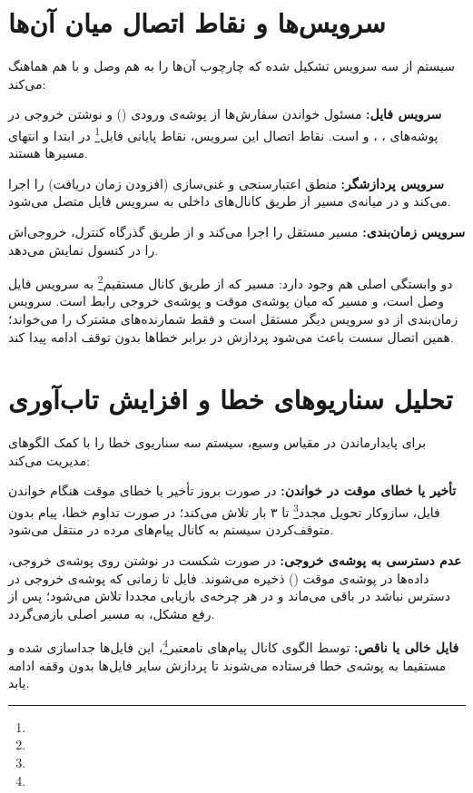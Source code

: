 \documentclass[a4paper,12pt]{article}
\newcommand{\term}[1]{\textbf{\textcolor{sbublue2}{#1:}}}
\begin{document}
\section{سرویس‌ها و نقاط اتصال میان آن‌ها}
سیستم از سه سرویس تشکیل شده که چارچوب  آن‌ها را به هم وصل و با هم هماهنگ می‌کند:
\begin{terms}
  \item \term{سرویس فایل} مسئول خواندن سفارش‌ها از پوشه‌ی ورودی () و نوشتن خروجی در پوشه‌های ، ،  و  است. نقاط اتصال این سرویس، نقاط پایانی فایل\footnote{} در ابتدا و انتهای مسیرها هستند.
  \item \term{سرویس پردازشگر} منطق اعتبارسنجی و غنی‌سازی (افزودن زمان دریافت) را اجرا می‌کند و در میانه‌ی مسیر  از طریق کانال‌های داخلی به سرویس فایل متصل می‌شود.
  \item \term{سرویس زمان‌بندی} مسیر مستقل  را اجرا می‌کند و از طریق گذرگاه کنترل، خروجی‌اش را در کنسول نمایش می‌دهد.
\end{terms}
دو وابستگی اصلی هم وجود دارد: مسیر  که از طریق کانال مستقیم\footnote{} به سرویس فایل وصل است، و مسیر  که میان پوشه‌ی موقت و پوشه‌ی خروجی رابط است. سرویس زمان‌بندی از دو سرویس دیگر مستقل است و فقط شمارنده‌های مشترک را می‌خواند؛ همین اتصال سست باعث می‌شود پردازش در برابر خطاها بدون توقف ادامه پیدا کند.

\section{تحلیل سناریوهای خطا و افزایش تاب‌آوری}
برای پایدارماندن در مقیاس وسیع، سیستم سه سناریوی خطا را با کمک الگوهای  مدیریت می‌کند:
\begin{terms}
  \item \term{تأخیر یا خطای موقت در خواندن} در صورت بروز تأخیر یا خطای موقت هنگام خواندن فایل، سازوکار تحویل مجدد\footnote{} تا ۳ بار تلاش می‌کند؛ در صورت تداوم خطا، پیام بدون متوقف‌کردن سیستم به کانال پیام‌های مرده در  منتقل می‌شود.
  \item \term{عدم دسترسی به پوشه‌ی خروجی} در صورت شکست در نوشتن روی پوشه‌ی خروجی، داده‌ها در پوشه‌ی موقت () ذخیره می‌شوند. فایل تا زمانی که پوشه‌ی خروجی در دسترس نباشد در  باقی می‌ماند و در هر چرخه‌ی بازیابی مجددا تلاش می‌شود؛ پس از رفع مشکل، به مسیر اصلی بازمی‌گردد.
  \item \term{فایل خالی یا ناقص} توسط الگوی کانال پیام‌های نامعتبر\footnote{}، این فایل‌ها جداسازی شده و مستقیما به پوشه‌ی خطا فرستاده می‌شوند تا پردازش سایر فایل‌ها بدون وقفه ادامه یابد.
\end{terms}
\end{document}
